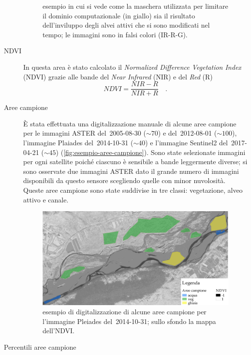 \begin{description}
\begin{figure}[t]
			{esempio in cui si vede come la maschera utilizzata per limitare il dominio computazionale (in giallo) sia il risultato dell'inviluppo degli alvei attivi che si sono modificati nel tempo; le immagini sono in falsi colori (IR-R-G).}
		\label{fig:esempio-maschera}
	\end{figure}
	\item[NDVI] 
	In questa area è stato calcolato il \emph{Normalized Difference Vegetation Index} (NDVI) grazie alle bande del \emph{Near Infrared} (NIR) e del \emph{Red} (R)
	\begin{equation}
		NDVI = \frac{NIR - R}{NIR + R} \quad .
		\label{eq:ndvi}
	\end{equation}
	\item[Aree campione]
	\`{E} stata effettuata una digitalizzazione manuale di alcune aree campione per le immagini ASTER del~2005-08-30 ($\sim 70$) e del~2012-08-01 ($\sim 100$), l'immagine Plaiades del~2014-10-31 ($\sim 40$) e l'immagine Sentinel2 del~2017-04-21 ($\sim 45$) (\vref{fig:esempio-aree-campione}).
	Sono state selezionate immagini per ogni satellite poiché ciascuno è sensibile a bande leggermente diverse; si sono osservate due immagini ASTER dato il grande numero di immagini disponibili da questo sensore scegliendo quelle con minor nuvolosità.
	\\
	Queste aree campione sono state suddivise in tre classi: vegetazione, alveo attivo e canale.
	\begin{figure}[ht]
		\centering
		\includegraphics[width=\textwidth]{files/esempio_aree_campione_2014_10_31.jpeg}
		\caption[esempio di aree campione per calcolare la distribuzione dell'NDVI]{esempio di digitalizzazione di alcune aree campione per l'immagine Pleiades del~2014-10-31; sullo sfondo la mappa dell'NDVI.}
		\label{fig:esempio-aree-campione}
	\end{figure}
	\item[Percentili aree campione]

\end{description}
